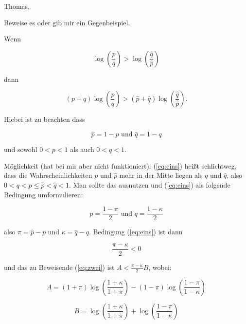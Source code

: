 \documentclass[11pt]{article}
\begin{document}
Thomas,

Beweise es oder gib mir ein Gegenbeispiel.

Wenn

\begin{equation}
\label{eq:eins}
  \log\left(\frac{p}{q}\right)>\log\left(\frac{\hat{q}}{\hat{p}}\right)
\end{equation}

dann

\begin{equation}
\label{eq:zwei}
  (p+q)\log\left(\frac{p}{q}\right)>(\hat{p}+\hat{q})\log\left(\frac{\hat{q}}{\hat{p}}\right).
\end{equation}

Hiebei ist zu beachten dass

\begin{equation}
\label{eq:drei}
  \hat{p}=1-p\mbox{ und }\hat{q}=1-q
\end{equation}

und sowohl $0<p<1$ als auch $0<q<1$.

M{\"o}glichkeit (hat bei mir aber nicht funktioniert): (\ref{eq:eins})
hei{\ss}t schlichtweg, dass die Wahrscheinlichkeiten $p$ und $\hat{p}$
mehr in der Mitte liegen als $q$ und $\hat{q}$, also
$0<q<p\leq{}\hat{p}<\hat{q}<1$. Man sollte das ausnutzen und
(\ref{eq:eins}) als folgende Bedingung umformulieren:

\begin{equation}
  \label{eq:vier}
  p=\frac{1-\pi}{2}\mbox{ und }q=\frac{1-\kappa}{2}
\end{equation}

also $\pi=\hat{p}-p$ und $\kappa=\hat{q}-q$. Bedingung (\ref{eq:eins})
ist dann 

\begin{equation}
  \label{eq:fuenf}
  \frac{\pi-\kappa}{2}<0
\end{equation}

und das zu Beweisende (\ref{eq:zwei}) ist $A<\frac{\pi-\kappa}{2}B$, wobei:

\begin{equation}
  \label{eq:sechs}
  A=(1+\pi)\log\left(\frac{1+\kappa}{1+\pi}\right)-(1-\pi)\log\left(\frac{1-\pi}{1-\kappa}\right)
\end{equation}

\begin{equation}
  \label{eq:sieben}
  B=\log\left(\frac{1+\kappa}{1+\pi}\right)+\log\left(\frac{1-\pi}{1-\kappa}\right)
\end{equation}
\end{document}
